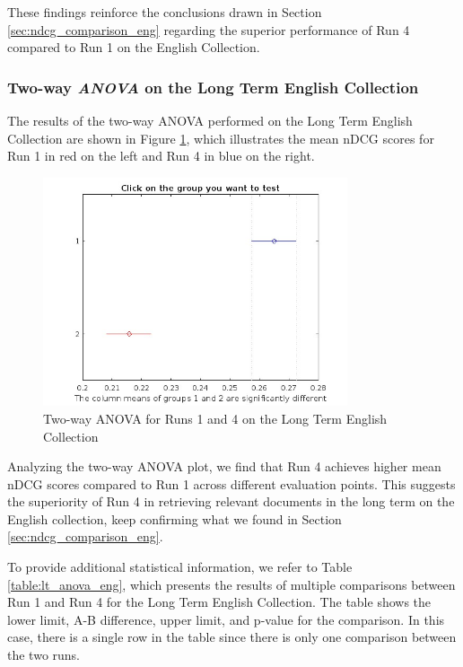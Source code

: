 These findings reinforce the conclusions drawn in Section \ref{sec:ndcg_comparison_eng} regarding the superior performance of Run 4 compared to Run 1 on the English Collection. 

\subsubsection{Two-way \textit{ANOVA} on the Long Term English Collection}

The results of the two-way \ac{ANOVA} performed on the Long Term English Collection are shown in Figure \ref{fig:lt_anova_eng}, which illustrates the mean \ac{nDCG} scores for Run 1 in red on the left and Run 4 in blue on the right. 

\begin{figure}[!h]
\centering
\includegraphics[width=0.8\textwidth]{figure/StatisticalAnalysis/AnovaTwoWay/LT_EN.jpg}
\caption{Two-way ANOVA for Runs 1 and 4 on the Long Term English Collection}
\label{fig:lt_anova_eng}
\end{figure}

Analyzing the two-way \ac{ANOVA} plot, we find that Run 4 achieves higher mean \ac{nDCG} scores compared to Run 1 across different evaluation points. 
This suggests the superiority of Run 4 in retrieving relevant documents in the long term on the English collection, keep confirming what we found in Section \ref{sec:ndcg_comparison_eng}. 

To provide additional statistical information, we refer to Table \ref{table:lt_anova_eng}, which presents the results of multiple comparisons between Run 1 and Run 4 for the Long Term English Collection. 
The table shows the lower limit, A-B difference, upper limit, and p-value for the comparison. 
In this case, there is a single row in the table since there is only one comparison between the two runs.

